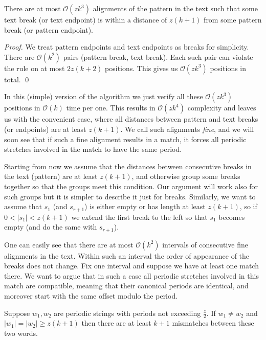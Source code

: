 \documentclass[runningheads]{llncs}
\begin{document}
\begin{proposition}\label{proposition:close_breaks}
There are at most $\mathcal{O}(zk^3)$ alignments of the pattern in the text such that some text break (or text endpoint) is within a distance of $z(k+1)$ from some pattern break (or pattern endpoint).
\end{proposition}

\begin{proof}
We treat pattern endpoints  and text endpoints as breaks for simplicity. There are $\mathcal{O}(k^2)$ pairs (pattern break, text break). Each such pair can violate the rule on at most $2z(k+2)$ positions. This gives us $\mathcal{O}(zk^3)$ positions in total.
\qed
\end{proof}

In this (simple) version of the algorithm we just verify all these $\mathcal{O}(zk^3)$ positions in $\mathcal{O}(k)$ time per one. This results in $\mathcal{O}(zk^4)$ complexity and leaves us with the convenient case, where all distances between pattern and text breaks (or endpoints) are at least $z(k+1)$. We call such alignments {\it fine}, and we will
soon see that if such a fine alignment results in a match, it forces all periodic stretches involved in the match to have the same period.

Starting from now we assume that the distances between consecutive breaks in the text (pattern) are at least $z(k+1)$, and otherwise group some breaks together so that the groups meet this condition. Our argument will work also for such groups but it is simpler to describe it just for breaks. 
Similarly, we want to assume that $s_1$ (and $s_{r+1}$) is either empty or has length at least $z(k+1)$, so if $0<|s_1|<z(k+1)$ we extend the first break to the left so that $s_1$ becomes empty (and do the same with $s_{r+1}$). 

One can easily see that there are at most $\mathcal{O}(k^2)$ intervals of consecutive fine alignments in the text. Within such an interval the order of appearance of the breaks does not change. Fix one interval and suppose we have at least one match there. We want to argue that in such a case all periodic stretches involved in this match are compatible, meaning
that their canonical periods are identical, and moreover start with the same offset modulo the period.

\begin{proposition}\label{proposition:periodic_mismatches}
Suppose $w_1, w_2$ are periodic strings with periods not exceeding $\frac{z}{2}$. If $w_1\neq w_2$ and $|w_1|=|w_2|\geq z(k+1)$ then there are at least $k+1$ mismatches between these two words.
\end{proposition}
\end{document}
